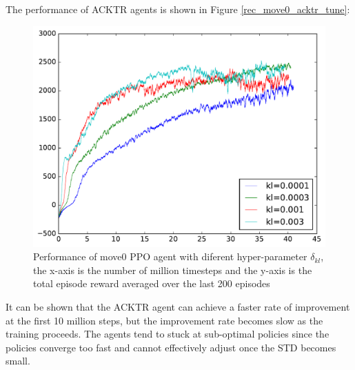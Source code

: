 The performance of ACKTR agents is shown in Figure \ref{rec_move0_acktr_tune}:
\begin{figure}[h]
\includegraphics[width=\textwidth]{images/rec_move0_acktr_tune.pdf}
\centering
\caption{Performance of move0 PPO agent with diferent hyper-parameter $\delta_{kl}$, the x-axis is the number of million timesteps and the y-axis is the total episode reward averaged over the last 200 episodes}
\end{figure}\label{rec_move0_acktr_tune}
It can be shown that the ACKTR agent can achieve a faster rate of improvement at the first 10 million steps, but the improvement rate becomes slow as the training proceeds. The agents tend to stuck at sub-optimal policies since the policies converge too fast and cannot effectively adjust once the STD becomes small.

